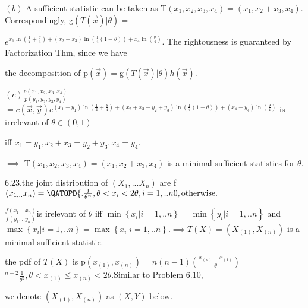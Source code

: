 \documentclass{article}
\begin{document}
$\left( b\right) $ A sufficient statistic can be taken as T$\left(
x_{1},x_{2},x_{3},x_{4}\right) =\left( x_{1},x_{2}+x_{3},x_{4}\right) .$%
Correspondingly, g$\left( T\left( \vec{x}\right) |\theta \right) =$

$e^{x_{1}\ln \left( \frac{1}{2}+\frac{\theta }{4}\right) +\left(
x_{2}+x_{3}\right) \ln \left( \frac{1}{4}\left( 1-\theta \right) \right)
+x_{4}\ln \left( \frac{\theta }{4}\right) }.$ The rightousness is guaranteed
by Factorization Thm, since we have

the decomposition of p$\left( \vec{x}\right) =$g$\left( T\left( \vec{x}%
\right) |\theta \right) h\left( \vec{x}\right) .$

$\left( c\right) \frac{p\left( x_{1},x_{2},x_{3},x_{4}\right) }{p\left(
y_{1},y_{2},y_{3},y_{4}\right) }$ $=c\left( \vec{x},\vec{y}\right) e^{\left(
x_{1}-y_{1}\right) \ln \left( \frac{1}{2}+\frac{\theta }{4}\right) +\left(
x_{2}+x_{3}-y_{2}+y_{3}\right) \ln \left( \frac{1}{4}\left( 1-\theta \right)
\right) +\left( x_{4}-y_{4}\right) \ln \left( \frac{\theta }{4}\right) }$%
\qquad is irrelevant of $\theta \in \left( 0,1\right) $

iff $x_{1}=y_{1},x_{2}+x_{3}=y_{2}+y_{3},x_{4}=y_{4}.$

$\implies $ T$\left( x_{1},x_{2},x_{3},x_{4}\right) =\left(
x_{1},x_{2}+x_{3},x_{4}\right) $ is a minimal sufficient statistics for $%
\theta .$

$6.23.$the joint distribution of $\left( X_{1},...X_{n}\right) $ are f$%
\left( x_{1,..}x_{n}\right) =\QATOPD\{ . {\frac{1}{\theta ^{n}},\theta
<x_{i}<2\theta ,i=1,..n}{0,\text{otherwise}}.$

$\frac{f\left( x_{1},..x_{n}\right) }{f\left( y_{1},..y_{n}\right) }$is
irelevant of $\theta $ iff $\min \left\{ x_{i}|i=1,..n\right\} =\min \left\{
y_{i}|i=1,..n\right\} $ and $\max \left\{ x_{i}|i=1,..n\right\} =\max
\left\{ x_{i}|i=1,..n\right\} .\implies T\left( X\right) =\left( X_{\left(
1\right) },X_{\left( n\right) }\right) $ is a minimal sufficient statistic.

the pdf of $T\left( X\right) $ is p$\left( x_{\left( 1\right) },x_{\left(
n\right) }\right) =n\left( n-1\right) \left( \frac{x_{\left( n\right)
}-x_{\left( 1\right) }}{\theta }\right) $ $^{n-2}\frac{1}{\theta ^{2}}%
,\theta <x_{\left( 1\right) }\leq x_{\left( n\right) }<2\theta .$Similar to
Problem 6.10,

we denote $\left( X_{\left( 1\right) },X_{\left( n\right) }\right) $ as $%
\left( X,Y\right) $ below.
\end{document}
